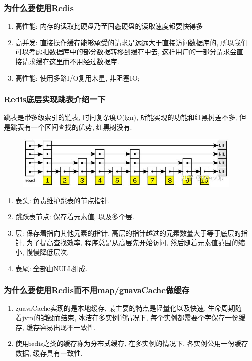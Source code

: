 \documentclass[UTF8]{ctexart}
\begin{document}
\subsubsection{为什么要使用Redis}
\begin{enumerate}
	\item 高性能: 内存的读取比硬盘乃至固态硬盘的读取速度都要快得多
	\item 高并发: 直接操作缓存能够承受的请求是远远大于直接访问数据库的, 所以我们可以考虑把数据库中的部分数据转移到缓存中去, 这样用户的一部分请求会直接请求缓存这里而不用经过数据库. 
	\item 高性能: 使用多路I/O复用木星, 非阻塞IO;
\end{enumerate}
\subsubsection{Redis底层实现跳表介绍一下}
跳表是带多级索引的链表, 时间复杂度O(lgn), 所能实现的功能和红黑树差不多, 但是跳表有一个区间查找的优势, 红黑树没有.
\begin{figure}
	\centering
	\includegraphics[width=0.7\linewidth]{figures/jump_table.jpg}
	\caption{}
	\label{fig:redissharding}
\end{figure}
\begin{enumerate}
	\item 表头: 负责维护跳表的节点指针.
	\item 跳跃表节点: 保存着元素值, 以及多个层.
	\item 层: 保存着指向其他元素的指针, 高层的指针越过的元素数量大于等于底层的指针, 为了提高查找效率, 程序总是从高层先开始访问, 然后随着元素值范围的缩小, 慢慢降低层次.
	\item 表尾: 全部由NULL组成.
\end{enumerate}

\subsubsection{为什么要使用Redis而不用map/guavaCache做缓存}
\begin{enumerate}
	\item guavaCache实现的是本地缓存, 最主要的特点是轻量化以及快速, 生命周期随着jvm的销毁而结束, 冰洁在多实例的情况下, 每个实例都需要个字保存一份缓存, 缓存容易出现不一致性.
	\item 使用redis之类的缓存称为分布式缓存, 在多实例的情况下, 各实例公用一份缓存数据, 缓存具有一致性.
\end{enumerate}
\end{document}
